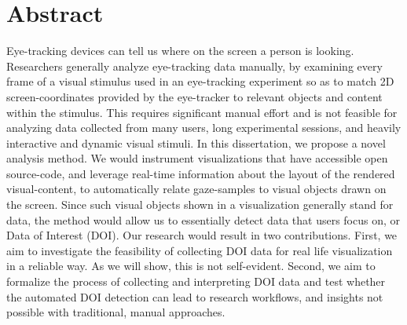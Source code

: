 \chapter*{Abstract}
Eye-tracking devices can tell us where on the screen a person is looking. Researchers generally analyze eye-tracking data manually, by examining every frame of a visual stimulus used in an eye-tracking experiment so as to match 2D screen-coordinates provided by the eye-tracker to relevant objects and content within the stimulus.  This requires significant manual effort and is not feasible for analyzing data collected from many users, long experimental sessions, and heavily interactive and dynamic visual stimuli. In this dissertation, we propose a novel analysis method. We would instrument visualizations that have accessible open source-code, and leverage real-time information about the layout of the rendered visual-content, to automatically relate gaze-samples to visual objects drawn on the screen. Since such visual objects shown in a visualization generally stand for data, the method would allow us to essentially detect data that users focus on, or Data of Interest (DOI). Our research would result in two contributions. First, we aim to investigate the feasibility of collecting DOI data for real life visualization in a reliable way. As we will show, this is not self-evident. Second, we aim to formalize the process of collecting and interpreting DOI data and test whether the automated DOI detection can lead to research workflows, and insights not possible with traditional, manual approaches.   